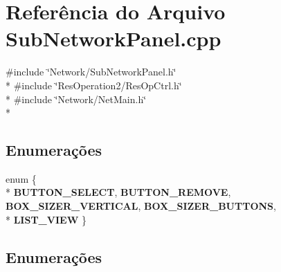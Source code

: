 \section{Referência do Arquivo Sub\+Network\+Panel.\+cpp}
\label{_sub_network_panel_8cpp}
{\ttfamily \#include \char`\"{}Network/\+Sub\+Network\+Panel.\+h\char`\"{}}\\*
{\ttfamily \#include \char`\"{}Res\+Operation2/\+Res\+Op\+Ctrl.\+h\char`\"{}}\\*
{\ttfamily \#include \char`\"{}Network/\+Net\+Main.\+h\char`\"{}}\\*
\subsection*{Enumerações}
\begin{DoxyCompactItemize}
\item 
enum \{ \\*
{\bf B\+U\+T\+T\+O\+N\+\_\+\+S\+E\+L\+E\+CT}, 
{\bf B\+U\+T\+T\+O\+N\+\_\+\+R\+E\+M\+O\+VE}, 
{\bf B\+O\+X\+\_\+\+S\+I\+Z\+E\+R\+\_\+\+V\+E\+R\+T\+I\+C\+AL}, 
{\bf B\+O\+X\+\_\+\+S\+I\+Z\+E\+R\+\_\+\+B\+U\+T\+T\+O\+NS}, 
\\*
{\bf L\+I\+S\+T\+\_\+\+V\+I\+EW}
 \}
\end{DoxyCompactItemize}


\subsection{Enumerações}
